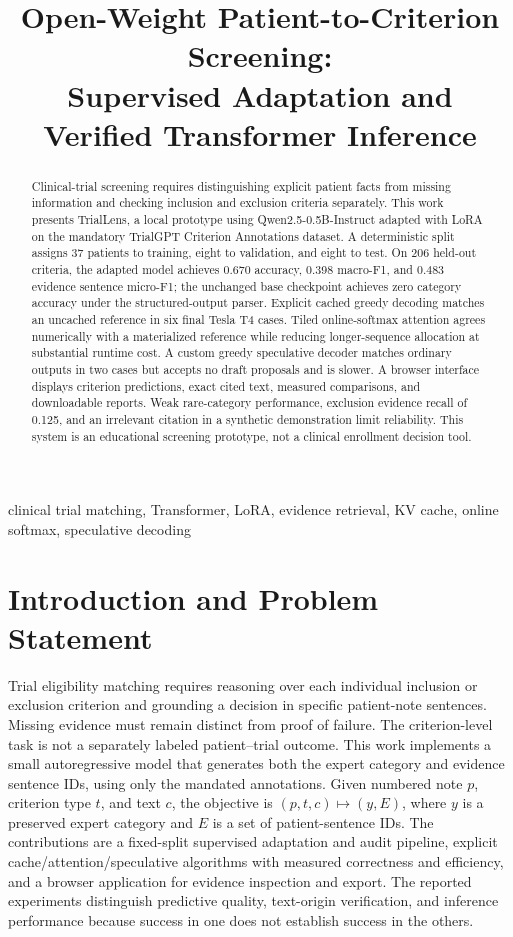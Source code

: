 \documentclass[conference]{IEEEtran}
\title{Open-Weight Patient-to-Criterion Screening:\\Supervised Adaptation and Verified Transformer Inference}
\author{\IEEEauthorblockN{Muhammad Abdullah}
\IEEEauthorblockA{Student ID: 23i-0509\\FAST National University of Computer and Emerging Sciences\\Islamabad, Pakistan\\\texttt{i230509@isb.nu.edu.pk}}}
\begin{document}
\maketitle
\begin{abstract}
Clinical-trial screening requires distinguishing explicit patient facts from missing information and checking inclusion and exclusion criteria separately. This work presents TrialLens, a local prototype using Qwen2.5-0.5B-Instruct adapted with LoRA on the mandatory TrialGPT Criterion Annotations dataset. A deterministic split assigns 37 patients to training, eight to validation, and eight to test. On 206 held-out criteria, the adapted model achieves 0.670 accuracy, 0.398 macro-F1, and 0.483 evidence sentence micro-F1; the unchanged base checkpoint achieves zero category accuracy under the structured-output parser. Explicit cached greedy decoding matches an uncached reference in six final Tesla T4 cases. Tiled online-softmax attention agrees numerically with a materialized reference while reducing longer-sequence allocation at substantial runtime cost. A custom greedy speculative decoder matches ordinary outputs in two cases but accepts no draft proposals and is slower. A browser interface displays criterion predictions, exact cited text, measured comparisons, and downloadable reports. Weak rare-category performance, exclusion evidence recall of 0.125, and an irrelevant citation in a synthetic demonstration limit reliability. This system is an educational screening prototype, not a clinical enrollment decision tool.
\end{abstract}
\begin{IEEEkeywords}clinical trial matching, Transformer, LoRA, evidence retrieval, KV cache, online softmax, speculative decoding\end{IEEEkeywords}
\section{Introduction and Problem Statement}

Trial eligibility matching requires reasoning over each individual inclusion or exclusion criterion and grounding a decision in specific patient-note sentences. Missing evidence must remain distinct from proof of failure. The criterion-level task is not a separately labeled patient--trial outcome. This work implements a small autoregressive model that generates both the expert category and evidence sentence IDs, using only the mandated annotations.
Given numbered note $p$, criterion type $t$, and text $c$, the objective is $(p,t,c)\mapsto(y,E)$, where $y$ is a preserved expert category and $E$ is a set of patient-sentence IDs. The contributions are a fixed-split supervised adaptation and audit pipeline, explicit cache/attention/speculative algorithms with measured correctness and efficiency, and a browser application for evidence inspection and export. The reported experiments distinguish predictive quality, text-origin verification, and inference performance because success in one does not establish success in the others.
\end{document}
